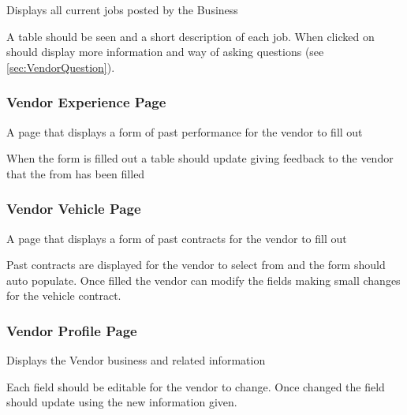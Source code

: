 \documentclass[10pt]{article}
\newcounter{subsubsubsection}[subsubsection]
\begin{document}

Displays all current jobs posted by the Business


A table should be seen and a short description of each job. When clicked on should display more information and way of asking questions (see \vref{sec:VendorQuestion}).  

\subsubsection{Vendor Experience Page}\label{sec:VendorExperience}


A page that displays a form of past performance for the vendor to fill out  


When the form is filled out a table should update giving feedback to the vendor that the from has been filled 

\subsubsection{Vendor Vehicle Page}\label{sec:VendorVehicle}


A page that displays a form of past contracts for the vendor to fill out  


Past contracts are displayed for the vendor to select from and the form should auto populate. Once filled the vendor can modify the fields making small changes for the vehicle contract. 

\subsubsection{Vendor Profile Page}\label{sec:VendorProfile}


Displays the Vendor business and related information


Each field should be editable for the vendor to change. Once changed the field should update using the new information given.
\end{document}
